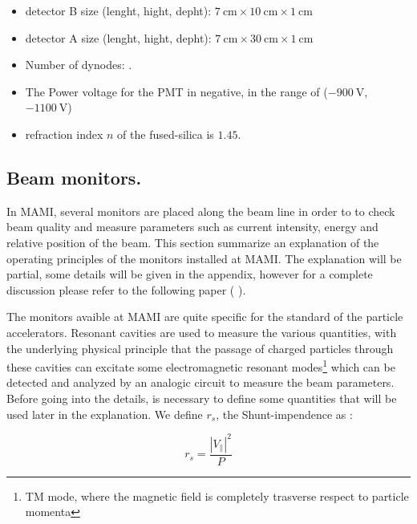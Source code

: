 \begin{itemize}
\item detector B size (lenght, hight, depht): $\SI{7}{\centi \meter} \times \SI{10}{\centi \meter} \times \SI{1}{\centi \meter}$
\item detector A size (lenght, hight, depht): $\SI{7}{\centi \meter} \times \SI{30}{\centi \meter} \times \SI{1}{\centi \meter}$
\item Number of dynodes: .
\item The Power voltage for the PMT in negative, in the range of ($\SI{-900}{\volt}$, $\SI{-1100}{\volt}$)
\item refraction index $n$ of the fused-silica is $1.45$.
\end{itemize}


\subsection{Beam monitors.}

In MAMI, several monitors are placed along the beam line in order to to check beam quality and measure parameters such as current intensity, energy and relative position of the beam. This section summarize an explanation of the operating principles of the monitors installed at MAMI. The explanation will be partial, some details will be given in the appendix, however for a complete discussion please refer to the following paper ( \cite{M_Dehn}).

The monitors avaible at MAMI are quite specific for the standard of the particle accelerators. Resonant cavities are used to measure the various quantities, with the underlying physical principle that the passage of charged particles through these cavities can excitate some electromagnetic resonant modes\footnote{TM mode, where the magnetic field is completely trasverse respect to particle momenta} which can be detected and analyzed by an analogic circuit to measure the beam parameters.
Before going into the details, is necessary to define some quantities that will be used later in the explanation. We define $r_{s}$, the Shunt-impendence as :

\begin{equation}
r_{s} = \frac{|V_{\|}|^{2}}{P}
\end{equation}

